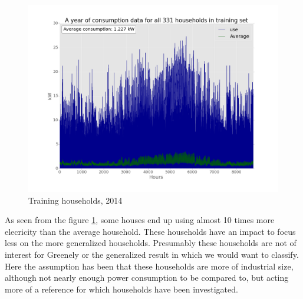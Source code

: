 \begin{figure}[H]
	\centering
	\includegraphics[scale=0.30]{./figures/houseuse}
	\caption{Training households, 2014}
	\label{fig:houseuse}
\end{figure}

As seen from the figure \ref{fig:houseuse}, some houses end up using almost 10 times more elecricity than the average household. These households have an impact to focus less on the more generalized households. Presumably these households are not of interest for Greenely or the generalized result in which we would want to classify. Here the assumption has been that these households are more of industrial size, although not nearly enough power consumption to be compared to, but acting more of a reference for which households have been investigated.


